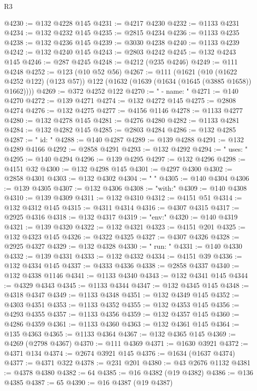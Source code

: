 \begin{lexlean}{R3}
\begin{coremodule}
@4230 := @132 @4228 @145
@4231 := @4217 @4230
@4232 := @1133 @4231
@4234 := @132 @4232 @145
@4235 := @2815 @4234
@4236 := @1133 @4235
@4238 := @132 @4236 @145
@4239 := @3030 @4238
@4240 := @1133 @4239
@4242 := @132 @4240 @145
@4243 := @2803 @4242
@4245 := @132 @4243 @145
@4246 := @287 @4245
@4248 := @4212 (@235 @4246)
@4249 := @111 @4248
@4252 := @123 (@10 @52 @56)
@4267 := @111
    (@1621
      (@10 (@1622 @4252 @122) (@123 @57))
      @122
      (@1632 (@1639 (@1634 (@1645 (@3885 @1658)) @1662))))
@4269 := @372 @4252 @122
@4270 := "      - name: "
@4271 := @140 @4270
@4272 := @139 @4271
@4274 := @132 @4272 @145
@4275 := @2808 @4274
@4276 := @132 @4275
@4277 := @4156 @1146
@4278 := @1133 @4277
@4280 := @132 @4278 @145
@4281 := @4276 @4280
@4282 := @1133 @4281
@4284 := @132 @4282 @145
@4285 := @2803 @4284
@4286 := @132 @4285
@4287 := "        id: "
@4288 := @140 @4287
@4289 := @139 @4288
@4291 := @132 @4289 @4166
@4292 := @2858 @4291
@4293 := @132 @4292
@4294 := "        uses: "
@4295 := @140 @4294
@4296 := @139 @4295
@4297 := @132 @4296
@4298 := @4151 @32
@4300 := @132 @4298 @145
@4301 := @4297 @4300
@4302 := @2858 @4301
@4303 := @132 @4302
@4304 := "        "
@4305 := @140 @4304
@4306 := @139 @4305
@4307 := @132 @4306
@4308 := "with:"
@4309 := @140 @4308
@4310 := @139 @4309
@4311 := @132 @4310
@4312 := @4151 @51
@4314 := @132 @4312 @145
@4315 := @4311 @4314
@4316 := @4307 @4315
@4317 := @2925 @4316
@4318 := @132 @4317
@4319 := "env:"
@4320 := @140 @4319
@4321 := @139 @4320
@4322 := @132 @4321
@4323 := @4151 @201
@4325 := @132 @4323 @145
@4326 := @4322 @4325
@4327 := @4307 @4326
@4328 := @2925 @4327
@4329 := @132 @4328
@4330 := "        run: "
@4331 := @140 @4330
@4332 := @139 @4331
@4333 := @132 @4332
@4334 := @4151 @39
@4336 := @132 @4334 @145
@4337 := @4333 @4336
@4338 := @2858 @4337
@4340 := @132 @4338 @1146
@4341 := @1133 @4340
@4343 := @132 @4341 @145
@4344 := @4329 @4343
@4345 := @1133 @4344
@4347 := @132 @4345 @145
@4348 := @4318 @4347
@4349 := @1133 @4348
@4351 := @132 @4349 @145
@4352 := @4303 @4351
@4353 := @1133 @4352
@4355 := @132 @4353 @145
@4356 := @4293 @4355
@4357 := @1133 @4356
@4359 := @132 @4357 @145
@4360 := @4286 @4359
@4361 := @1133 @4360
@4363 := @132 @4361 @145
@4364 := @135 @4363
@4365 := @1133 @4364
@4367 := @132 @4365 @145
@4369 := @4269 (@2798 @4367)
@4370 := @111 @4369
@4371 := @1630 @3921
@4372 := @4371 @134
@4374 := @2674 @3921 @145
@4376 := @1634 (@1637 @4374)
@4377 := @4371 @322
@4378 := @231 @201
@4380 := @43 @2676 @1132
@4381 := @4378 @4380
@4382 := 64
@4385 := @16 @4382 (@19 @4382)
@4386 := @136 @4385
@4387 := 65
@4390 := @16 @4387 (@19 @4387)

\end{coremodule}
\end{lexlean}
